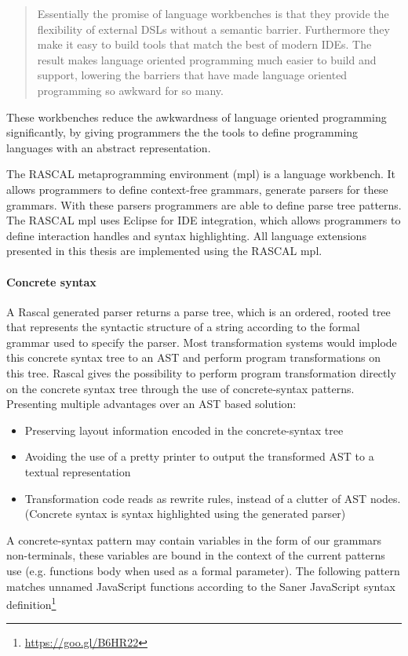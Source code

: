 \blockquote[\cite{Fowler2005}]{Essentially the promise of language workbenches is that they provide the flexibility of external DSLs without a semantic barrier. Furthermore they make it easy to build tools that match the best of modern IDEs. The result makes language oriented programming much easier to build and support, lowering the barriers that have made language oriented programming so awkward for so many.}

These workbenches reduce the awkwardness of language oriented programming\cite{Ward1994} significantly, by giving programmers the the tools to define programming languages with an abstract representation.

The RASCAL\cite{Klint} metaprogramming environment (mpl) is a language workbench. It allows programmers to define context-free grammars, generate parsers for these grammars. With these parsers programmers are able to define parse tree patterns. The RASCAL mpl uses Eclipse for IDE integration, which allows programmers to define interaction handles and syntax highlighting. All language extensions presented in this thesis are implemented using the RASCAL mpl.

\paragraph{Concrete syntax}
A Rascal generated parser returns a parse tree, which is an ordered, rooted tree that represents the syntactic structure of a string according to the formal grammar used to specify the parser. Most transformation systems would implode this concrete syntax tree to an AST and perform program transformations on this tree. Rascal gives the possibility to perform program transformation directly on the concrete syntax tree through the use of concrete-syntax patterns. Presenting multiple advantages over an AST based solution:
\begin{itemize}
	\item Preserving layout information encoded in the concrete-syntax tree
	\item Avoiding the use of a pretty printer to output the transformed AST to a textual representation
	\item Transformation code reads as rewrite rules, instead of a clutter of AST nodes. (Concrete syntax is syntax highlighted using the generated parser)
\end{itemize}
A concrete-syntax pattern may contain variables in the form of our grammars non-terminals, these variables are bound in the context of the current patterns use (e.g. functions body when used as a formal parameter). The following pattern matches unnamed JavaScript functions according to the Saner JavaScript syntax definition\footnote{\url{https://goo.gl/B6HR22}}


